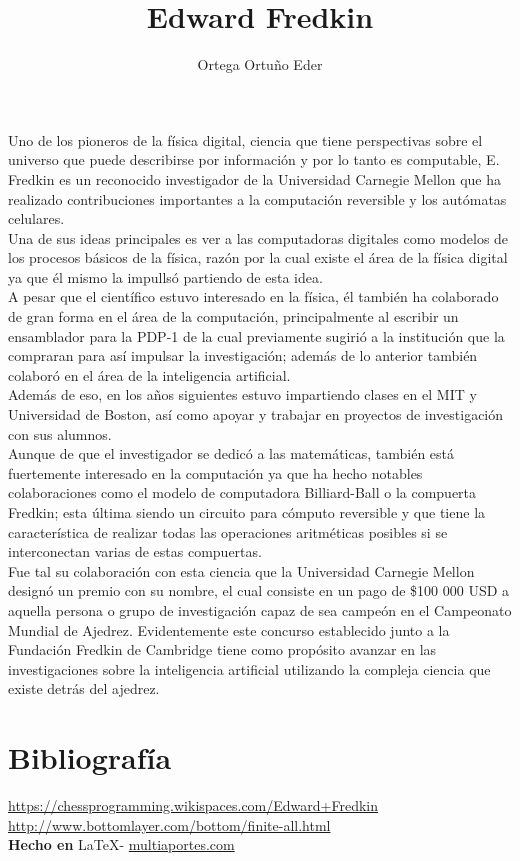 \documentclass{article}
\title{Edward Fredkin}
\author{Ortega Ortu\~no Eder}
\date{} %
\begin{document}
	\maketitle
	\normalsize{
Uno de los pioneros de la física digital, ciencia que tiene perspectivas sobre el universo que puede describirse por información y por lo tanto es computable, E. Fredkin es un reconocido investigador de la Universidad Carnegie Mellon que ha realizado contribuciones importantes a la computación reversible y los autómatas celulares.
\\

Una de sus ideas principales es ver a las computadoras digitales como modelos de los procesos básicos de la física, razón por la cual existe el área de la física digital ya que él mismo la impullsó partiendo de esta idea.
\\

A pesar que el científico estuvo interesado en la física, él también ha colaborado de gran forma en el área de la computación, principalmente al escribir un ensamblador para la PDP-1 de la cual previamente sugirió a la institución que la compraran para así impulsar la investigación; además de lo anterior también colaboró en el área de la inteligencia artificial.
\\

Además de eso, en los años siguientes estuvo impartiendo clases en el MIT y Universidad de Boston, así como apoyar y trabajar en proyectos de investigación con sus alumnos.
\\

Aunque de que el investigador se dedicó a las matemáticas, también está fuertemente interesado en la computación ya que ha hecho notables colaboraciones como el modelo de  computadora Billiard-Ball o la compuerta Fredkin; esta última siendo un circuito para cómputo reversible y que tiene la característica de realizar todas las operaciones aritméticas posibles si se interconectan varias de estas compuertas.
\\

Fue tal su colaboración con esta ciencia que la Universidad Carnegie Mellon designó un premio con su nombre, el cual consiste en un pago de \$100 000 USD a aquella persona o grupo de investigación capaz de sea campeón en el Campeonato Mundial de Ajedrez. Evidentemente este concurso establecido junto a la Fundación Fredkin de Cambridge tiene como propósito avanzar en las investigaciones sobre la inteligencia artificial utilizando la compleja ciencia que existe detrás del ajedrez.
}

\vspace{1cm}

\section*{Bibliograf\'ia}

\noindent \url{https://chessprogramming.wikispaces.com/Edward+Fredkin}
\\
\noindent \url{http://www.bottomlayer.com/bottom/finite-all.html}
\\

\large{\hfill \textbf{Hecho en } \LaTeX - \url{multiaportes.com}}
\end{document}
